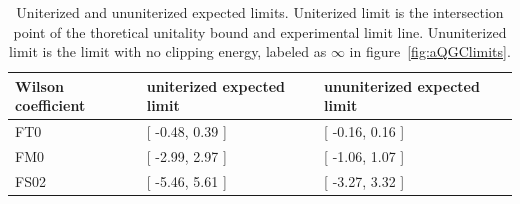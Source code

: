 \begin{table}[ht!]
\small
\begin{center}
\begin{tabular}{ | l || l | l |}
\hline
Wilson coefficient & uniterized expected limit  & ununiterized expected limit \tabularnewline \hline
FT0                &  [ -0.48, 0.39 ]            & [ -0.16, 0.16 ]              \tabularnewline \hline
FM0                &  [ -2.99, 2.97 ]            & [ -1.06, 1.07 ]              \tabularnewline \hline
FS02               &  [ -5.46, 5.61 ]            & [ -3.27, 3.32 ]              \tabularnewline \hline
\end{tabular}
\caption{Uniterized and ununiterized expected limits. Uniterized limit is the intersection point of the thoretical unitality bound and experimental limit line. Ununiterized limit is the limit with no clipping energy, labeled as $\infty$ in figure~\ref{fig:aQGClimits}.}
\label{tab:aQGClimits}
\end{center}
\end{table}

